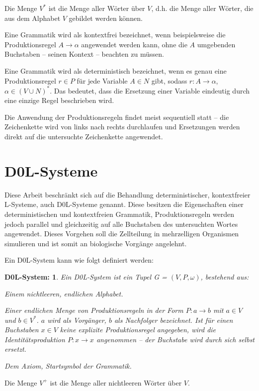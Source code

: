 Die Menge $V^*$ ist die Menge aller Wörter über $V$, d.h. die Menge aller Wörter, die aus dem Alphabet $V$ gebildet werden können. \cite[S.70]{ThI:14} 

Eine Grammatik wird als kontextfrei bezeichnet, wenn beispielsweise die Produktionsregel $A \rightarrow \alpha$ angewendet werden kann, ohne die $A$ umgebenden Buchstaben -- seinen Kontext -- beachten zu müssen. \cite[S.343]{ThI:14} 

Eine Grammatik wird als deterministisch bezeichnet, wenn es genau eine Produktionsregel $r \in P$ für jede Variable $A \in N$ gibt, sodass $r: A \rightarrow \alpha$, $\alpha \in (V \cup N )^*$. Das bedeutet, dass die Ersetzung einer Variable eindeutig durch eine einzige Regel beschrieben wird. \cite[S.75]{PCGiG:16}

Die Anwendung der Produktionsregeln findet meist sequentiell statt -- die Zeichenkette wird von links nach rechts durchlaufen und Ersetzungen werden direkt auf die untersuchte Zeichenkette angewendet. \cite[S.75]{PCGiG:16}

\section{D0L-Systeme}

Diese Arbeit beschränkt sich auf die Behandlung deterministischer, kontextfreier L-Systeme, auch D0L-Systeme genannt. Diese besitzen die Eigenschaften einer deterministischen und kontextfreien Grammatik, Produktionsregeln werden jedoch parallel und gleichzeitig auf alle Buchstaben des untersuchten Wortes angewendet. Dieses Vorgehen soll die Zellteilung in mehrzelligen Organismen simulieren und ist somit an biologische Vorgänge angelehnt. \cite[S. 3]{ABOP:04} 

Ein D0L-System kann wie folgt definiert werden:
\newtheorem{defD0LSystem}{D0L-System:}[chapter]
\begin{defD0LSystem}
	Ein D0L-System ist ein Tupel G = $(V, P, \omega)$, bestehend aus:
	
	\begin{description}[labelindent]
		\item[\boldmath$V$] Einem nichtleeren, endlichen Alphabet.\\
		
		\item[\boldmath$P$] Einer endlichen Menge von Produktionsregeln in der Form $P: a \rightarrow b$ mit $a \in V$ und $b \in V^*$. $a$ wird als Vorgänger, $b$ als Nachfolger bezeichnet. Ist für einen Buchstaben $x \in V$ keine explizite Produktionsregel angegeben, wird die Identitätsproduktion $P: x \rightarrow x$ angenommen -- der Buchstabe wird durch sich selbst ersetzt.\\
		
		\item[\boldmath$\omega \in V^+$]  Dem Axiom, Startsymbol der Grammatik.		
	\end{description}
\cite[S.4]{ABOP:04} 
\end{defD0LSystem}
Die Menge $V^+$ ist die Menge aller nichtleeren Wörter über $V$.  

